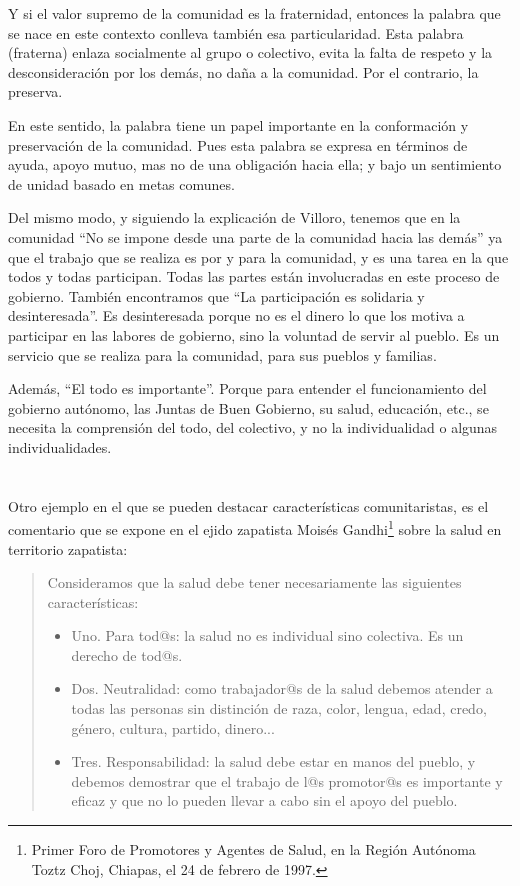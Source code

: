 \documentclass[oneside]{book}
\begin{document}
Y si el valor supremo de la comunidad es la fraternidad, entonces la palabra que se nace en este contexto conlleva también esa particularidad. Esta palabra (fraterna) enlaza socialmente al grupo o colectivo, evita la falta de respeto y la desconsideración por los demás, no daña a la comunidad. Por el contrario, la preserva. 

En este sentido, la palabra tiene un papel importante en la conformación y preservación de la comunidad. Pues esta palabra se expresa en términos de ayuda, apoyo mutuo, mas no de una obligación hacia ella; y bajo un sentimiento de unidad basado en metas comunes.

Del mismo modo, y siguiendo la explicación de Villoro, tenemos que en la comunidad “No se impone desde una parte de la comunidad hacia las demás” ya que el trabajo que se realiza es por y para la comunidad, y es una tarea en la que todos y todas participan. Todas las partes están involucradas en este proceso de gobierno. También encontramos que “La participación es solidaria y desinteresada”. Es desinteresada porque no es el dinero lo que los motiva a participar en las labores de gobierno, sino la voluntad de servir al pueblo. Es un servicio que se realiza para la comunidad, para sus pueblos y familias.

Además, “El todo es importante”. Porque para entender el funcionamiento del gobierno autónomo, las Juntas de Buen Gobierno, su salud, educación, etc., se necesita la comprensión del todo, del colectivo, y no la individualidad o algunas individualidades.
\\
\\
\\

Otro ejemplo en el que se pueden destacar características comunitaristas, es el comentario que se expone en el ejido zapatista Moisés Gandhi\footnote{Primer Foro de Promotores y Agentes de Salud, en la Región Autónoma Toztz Choj, Chiapas, el 24 de febrero de 1997.} sobre la salud en territorio zapatista:
\begin{quote}
Consideramos que la salud debe tener necesariamente las siguientes características:
\begin{itemize}
	\item Uno. Para tod@s: la salud no es individual sino colectiva. Es un derecho de tod@s.
	\item Dos. Neutralidad: como trabajador@s de la salud debemos atender a todas las personas sin distinción de raza, color, lengua, edad, credo, género, cultura, partido, dinero...
	\item Tres. Responsabilidad: la salud debe estar en manos del pueblo, y debemos demostrar que el trabajo de l@s promotor@s es importante y eficaz y que no lo pueden llevar a cabo sin el apoyo del pueblo.
\end{itemize}
\end{quote}
	
\end{document}

